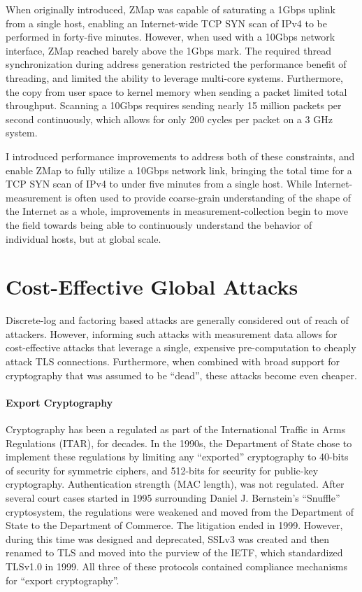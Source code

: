 When originally introduced, ZMap was capable of saturating a 1Gbps uplink from
a single host, enabling an Internet-wide TCP SYN scan of IPv4 to be performed
in forty-five minutes. However, when used with a 10Gbps network interface, ZMap
reached barely above the 1Gbps mark. The required thread synchronization during
address generation restricted the performance benefit of threading, and limited
the ability to leverage multi-core systems. Furthermore, the copy from user
space to kernel memory when sending a packet limited total throughput. Scanning
a 10Gbps requires sending nearly 15 million packets per second continuously,
which allows for only 200 cycles per packet on a 3 GHz system.

I introduced performance improvements to address both of these constraints, and
enable ZMap to fully utilize a 10Gbps network link, bringing the total time for
a TCP SYN scan of IPv4 to under five minutes from a single host. While
Internet-measurement is often used to provide coarse-grain understanding of the
shape of the Internet as a whole, improvements in measurement-collection begin
to move the field towards being able to continuously understand the behavior of
individual hosts, but at global scale.

\section{Cost-Effective Global Attacks}

Discrete-log and factoring based attacks are generally considered out of reach
of attackers.  However, informing such attacks with measurement data allows for
cost-effective attacks that leverage a single, expensive pre-computation to
cheaply attack TLS connections. Furthermore, when combined with broad support
for cryptography that was assumed to be “dead”, these attacks become even
cheaper.



\paragraph{Export Cryptography}
Cryptography has been a regulated as part of the International Traffic in Arms
Regulations (ITAR), for decades. In the 1990s, the Department of State chose to
implement these regulations by limiting any ``exported'' cryptography to
40-bits of security for symmetric ciphers, and 512-bits for security for
public-key cryptography. Authentication strength (\eg MAC length), was not
regulated. After several court cases started in 1995 surrounding Daniel J.
Bernstein's ``Snuffle'' cryptosystem, the regulations were weakened and moved
from the Department of State to the Department of Commerce. The litigation
ended in 1999. However, during this time \ssltwo was designed and deprecated,
SSLv3 was created and then renamed to TLS and moved into the purview of the
IETF, which standardized TLSv1.0 in 1999. All three of these protocols
contained compliance mechanisms for ``export cryptography''.

